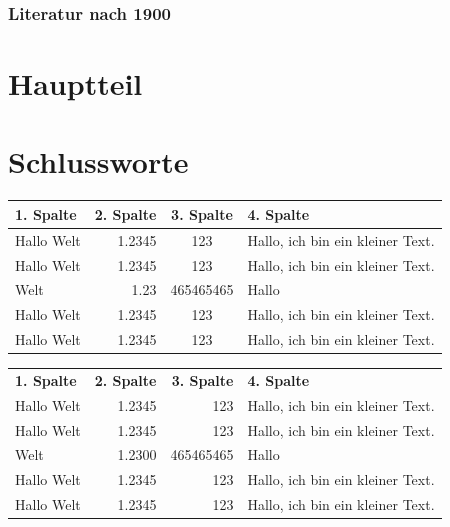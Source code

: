\documentclass[12pt,ngerman,parskip=half]{scrreprt} %
\begin{document}
\blindtext

\blindtext

\subsubsection{Literatur nach 1900}

\blindtext

\blindtext

\blindtext

\section{Hauptteil}\label{sec:hauptteil}

\blindtext[1]


\section{Schlussworte}

\blindtext[10]

\begin{tabular}{|l|r|c|p{70mm}|} \hline
\textbf{1. Spalte} & \textbf{2. Spalte} & \textbf{3. Spalte} & \textbf{4. Spalte} \\ \hline \hline
Hallo Welt & 1.2345 & 123 & Hallo, ich bin ein kleiner Text. \\ \hline
Hallo Welt & 1.2345 & 123 & Hallo, ich bin ein kleiner Text. \\ \hline
Welt & 1.23 & 465465465 & Hallo \\ \hline
Hallo Welt & 1.2345 & 123 & Hallo, ich bin ein kleiner Text. \\ \hline
Hallo Welt & 1.2345 & 123 & Hallo, ich bin ein kleiner Text. \\ \hline
\end{tabular}\vspace*{2cm}

\begin{center}
\begin{tabular}{lrrp{60mm}} \toprule[2pt]
\textbf{1. Spalte} & \textbf{2. Spalte} & \textbf{3. Spalte} & \textbf{4. Spalte} \\ \cmidrule[1pt](rl){1-4}
Hallo Welt & 1.2345 & 123 & Hallo, ich bin ein kleiner Text. \\ 
Hallo Welt & 1.2345 & 123 & Hallo, ich bin ein kleiner Text. \\ 
Welt & 1.2300 & 465465465 & Hallo \\ 
Hallo Welt & 1.2345 & 123 & Hallo, ich bin ein kleiner Text. \\ 
Hallo Welt & 1.2345 & 123 & Hallo, ich bin ein kleiner Text. \\ \bottomrule
\end{tabular}
\end{center}
\end{document}
